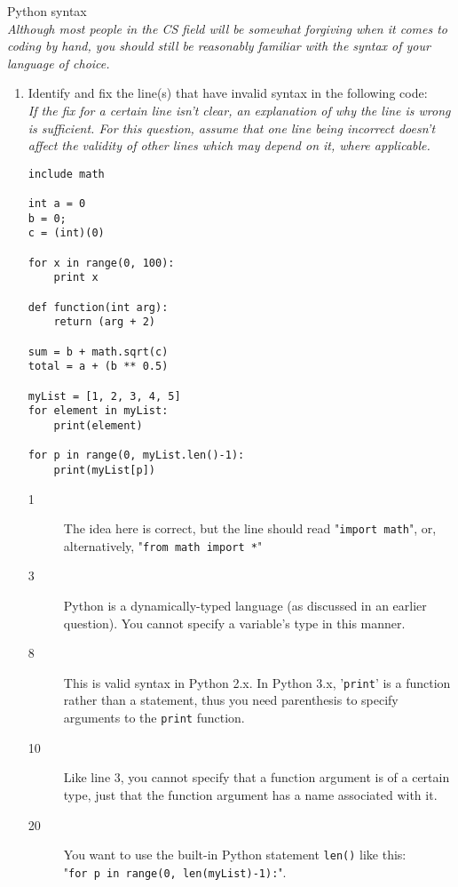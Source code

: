 Python syntax\\
\emph{Although most people in the CS field will be somewhat forgiving when it comes to coding by hand,
you should still be reasonably familiar with the syntax of your language of choice.}

\begin{enumerate}
\item Identify and fix the line(s) that have invalid syntax in the following code:\\
\emph{If the fix for a certain line isn't clear, an explanation of why the line is wrong is sufficient. For this question, assume that one line being incorrect doesn't affect the validity of other lines which may depend on it, where applicable.}
\begin{lstlisting}
include math

int a = 0
b = 0;
c = (int)(0)

for x in range(0, 100):
	print x

def function(int arg):
	return (arg + 2)

sum = b + math.sqrt(c)
total = a + (b ** 0.5)

myList = [1, 2, 3, 4, 5]
for element in myList:
	print(element)

for p in range(0, myList.len()-1):
	print(myList[p])
\end{lstlisting}
\begin{answer}
\begin{description}
	\item[1] The idea here is correct, but the line should read "\texttt{import math}", or, alternatively, "\texttt{from math import *}"
	\item[3] Python is a dynamically-typed language (as discussed in an earlier question). You cannot specify a variable's type in this manner.
	\item[8] This is valid syntax in Python 2.x. In Python 3.x, '\texttt{print}' is a function rather than a statement, thus you need parenthesis to specify arguments to the \texttt{print} function.
	\item[10] Like line 3, you cannot specify that a function argument is of a certain type, just that the function argument has a name associated with it.
	\item[20] You want to use the built-in Python statement \texttt{len()} like this:\\
	 "\texttt{for p in range(0, len(myList)-1):}".


\end{description}
\end{answer}


\end{enumerate}
